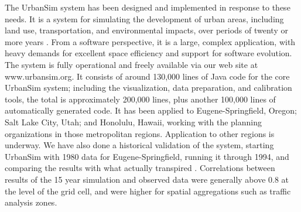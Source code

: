 The UrbanSim system has been designed and implemented in response
to these needs.  It is a system for simulating the development of
urban areas, including land use, transportation, and environmental
impacts, over periods of twenty or more years
\citep{waddell-env-and-planning-2000,urbansim-reference-2000,waddell-nse-2001}.
From a software perspective, it is a large, complex application,
with heavy demands for excellent space efficiency and support for
software evolution. The system is fully operational and freely
available via our web site at {\sf www.urbansim.org}.  It consists
of around 130,000 lines of Java code for the core UrbanSim system;
including the visualization, data preparation, and calibration
tools, the total is approximately 200,000 lines, plus another
100,000 lines of automatically generated code.  It has been
applied to Eugene-Springfield, Oregon; Salt Lake City, Utah; and
Honolulu, Hawaii, working with the planning organizations in those
metropolitan regions.  Application to other regions is underway.
We have also done a historical validation of the system, starting
UrbanSim with 1980 data for Eugene-Springfield, running it through
1994, and comparing the results with what actually transpired
\citep{waddell-oregon-2000}.  Correlations between results of the
15 year simulation and observed data were generally above 0.8 at
the level of the grid cell, and were higher for spatial
aggregations such as traffic analysis zones.

